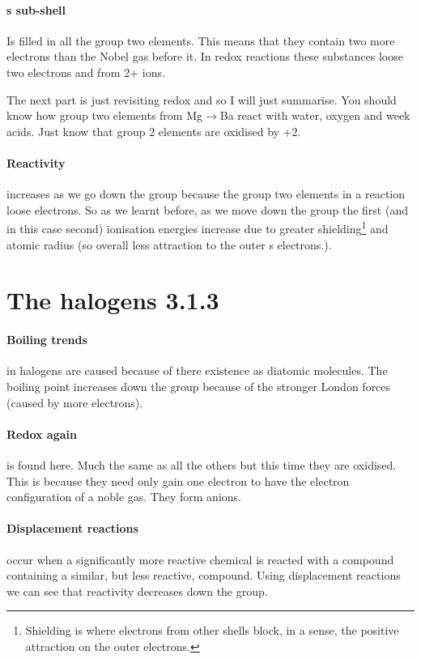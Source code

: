 	\paragraph{s sub-shell} Is filled in all the group two elements.
	This means that they contain two more electrons than the Nobel gas before it.
	In redox reactions these substances loose two electrons and from 2+ ions.
	
	The next part is just revisiting redox and so I will just summarise.
	You should know how group two elements from Mg$\rightarrow$Ba react with water, oxygen and week acids.
	Just know that group 2 elements are oxidised by +2.
	
	\paragraph{Reactivity} increases as we go down the group because the group two elements in a reaction loose electrons.
	So as we learnt before, as we move down the group the first (and in this case second) ionisation energies increase due to greater shielding\footnote{Shielding is where electrons from other shells block, in a sense, the positive attraction on the outer electrons.} and atomic radius (so overall less attraction to the outer s electrons.).
	
\section{The halogens 3.1.3}
	
	\paragraph{Boiling trends} in halogens are caused because of there existence as diatomic molecules.
	The boiling point increases down the group because of the stronger London forces (caused by more electrons).
	
	\paragraph{Redox again} is found here.
	Much the same as all the others but this time they are oxidised.
	This is because they need only gain one electron to have the electron configuration of a noble gas.
	They form anions.
	
	\paragraph{Displacement reactions} occur when a significantly more reactive chemical is reacted with a compound containing a similar, but less reactive, compound.
	Using displacement reactions we can see that reactivity decreases down the group.
	
